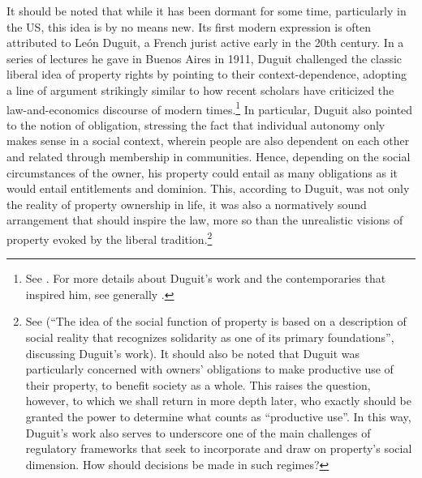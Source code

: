 It should be noted that while it has been dormant for some time, particularly in the US, this idea is by no means new. Its first modern expression is often attributed to Le{\'o}n Duguit, a French jurist active early in the 20th century. In a series of lectures he gave in Buenos Aires in 1911, Duguit challenged the classic liberal idea of property rights by pointing to their context-dependence, adopting a line of argument strikingly similar to how recent scholars have criticized the law-and-economics discourse of modern times.\footnote{See \cite[1004-1008]{forster11}. For more details about Duguit's work and the contemporaries that inspired him, see generally \cite{mirow10}.} In particular, Duguit also pointed to the notion of obligation, stressing the fact that individual autonomy only makes sense in a social context, wherein people are also dependent on each other and related through membership in communities. Hence, depending on the social circumstances of the owner, his property could entail as many obligations as it would entail entitlements and dominion. This, according to Duguit, was not only the reality of property ownership in life, it was also a normatively sound arrangement that should inspire the law, more so than the unrealistic visions of property evoked by the liberal tradition.\footnote{See \cite[1005]{forster11} (``The idea of the social function of property is based on a description of social reality that recognizes solidarity as one of its primary foundations'', discussing Duguit's work). It should also be noted that Duguit was particularly concerned with owners' obligations to make productive use of their property, to benefit society as a whole. This raises the question, however, to which we shall return in more depth later, who exactly should be granted the power to determine what counts as ``productive use''. In this way, Duguit's work also serves to underscore one of the main challenges of regulatory frameworks that seek to incorporate and draw on property's social dimension. How should decisions be made in such regimes?} 


